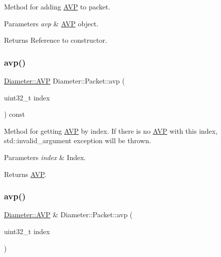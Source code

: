 Method for adding \hyperlink{classDiameter_1_1AVP}{A\+VP} to packet. 


\begin{DoxyParams}{Parameters}
{\em avp} & \hyperlink{classDiameter_1_1AVP}{A\+VP} object. \\
\hline
\end{DoxyParams}
\begin{DoxyReturn}{Returns}
Reference to constructor. 
\end{DoxyReturn}
\mbox{\label{classDiameter_1_1Packet_a5a3cc851ef92ab67f975155d2ac7dad9}} 
\subsubsection{\texorpdfstring{avp()}{avp()}\hspace{0.1cm}{\footnotesize\ttfamily [1/2]}}
{\footnotesize\ttfamily \hyperlink{classDiameter_1_1AVP}{Diameter\+::\+A\+VP} Diameter\+::\+Packet\+::avp (\begin{DoxyParamCaption}\item[{uint32\+\_\+t}]{index }\end{DoxyParamCaption}) const}



Method for getting \hyperlink{classDiameter_1_1AVP}{A\+VP} by index. If there is no \hyperlink{classDiameter_1_1AVP}{A\+VP} with this index, std\+::invalid\+\_\+argument exception will be thrown. 


\begin{DoxyParams}{Parameters}
{\em index} & Index. \\
\hline
\end{DoxyParams}
\begin{DoxyReturn}{Returns}
\hyperlink{classDiameter_1_1AVP}{A\+VP}. 
\end{DoxyReturn}
\mbox{\label{classDiameter_1_1Packet_ad6ef3d9705751366b4d04cfb3344f0ca}} 
\subsubsection{\texorpdfstring{avp()}{avp()}\hspace{0.1cm}{\footnotesize\ttfamily [2/2]}}
{\footnotesize\ttfamily \hyperlink{classDiameter_1_1AVP}{Diameter\+::\+A\+VP} \& Diameter\+::\+Packet\+::avp (\begin{DoxyParamCaption}\item[{uint32\+\_\+t}]{index }\end{DoxyParamCaption})}



